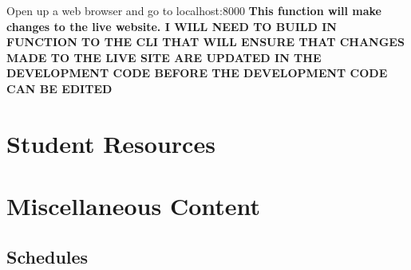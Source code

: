 \documentclass[justified]{LabArx3_5_1}
\begin{document}
Open up a web browser and go to localhost:8000
{\bf This function will make changes to the live website. I WILL NEED TO BUILD IN FUNCTION TO THE CLI THAT WILL ENSURE THAT CHANGES MADE TO THE LIVE SITE ARE UPDATED IN THE DEVELOPMENT CODE BEFORE THE DEVELOPMENT CODE CAN BE EDITED}




\chapter{Student Resources}\label{chap:student}

\chapter{Miscellaneous Content}\label{chap:misc}

\section{Schedules}\label{sec:schedule}
\end{document}
